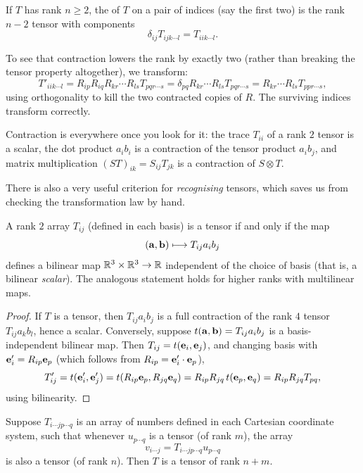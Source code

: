 \documentclass[a4paper]{scrartcl}
\begin{document}
\begin{definition}[Contraction]
	If $T$ has rank $n \geq 2$, the  of $T$ on a pair of indices (say the first two) is the rank $n - 2$ tensor with components
	$$
	\delta_{ij} T_{ijk \cdots l} = T_{iik\cdots l}.
	$$
\end{definition}

To see that contraction lowers the rank by exactly two (rather than breaking the tensor property altogether), we transform:
$$
T'_{iik\cdots l} = R_{ip}R_{iq}R_{kr} \cdots R_{ls} T_{pqr\cdots s} = \delta_{pq} R_{kr}\cdots R_{ls} T_{pqr \cdots s} = R_{kr}\cdots R_{ls}T_{ppr\cdots s},
$$
using orthogonality to kill the two contracted copies of $R$. The surviving indices transform correctly.

Contraction is everywhere once you look for it: the trace $T_{ii}$ of a rank $2$ tensor is a scalar, the dot product $a_i b_i$ is a contraction of the tensor product $a_i b_j$, and matrix multiplication $(ST)_{ik} = S_{ij}T_{jk}$ is a contraction of $S \otimes T$.

There is also a very useful criterion for \emph{recognising} tensors, which saves us from checking the transformation law by hand.

\begin{proposition}
	A rank $2$ array $T_{ij}$ (defined in each basis) is a tensor if and only if the map
	$$
	(\mathbf{a}, \mathbf{b}) \longmapsto T_{ij} a_i b_j
	$$
	defines a bilinear map $\mathbb{R}^3 \times \mathbb{R}^3 \rightarrow \mathbb{R}$ independent of the choice of basis (that is, a bilinear \emph{scalar}). The analogous statement holds for higher ranks with multilinear maps.
\end{proposition}
\begin{proof}
	If $T$ is a tensor, then $T_{ij}a_ib_j$ is a full contraction of the rank $4$ tensor $T_{ij}a_kb_l$, hence a scalar. Conversely, suppose $t(\mathbf{a}, \mathbf{b}) = T_{ij}a_ib_j$ is a basis-independent bilinear map. Then $T_{ij} = t(\mathbf{e}_i, \mathbf{e}_j)$, and changing basis with $\mathbf{e}_i' = R_{ip}\mathbf{e}_p$ (which follows from $R_{ip} = \mathbf{e}_i' \cdot \mathbf{e}_p$),
	$$
	T'_{ij} = t(\mathbf{e}_i', \mathbf{e}_j') = t(R_{ip} \mathbf{e}_p, R_{jq}\mathbf{e}_q) = R_{ip}R_{jq} \, t(\mathbf{e}_p, \mathbf{e}_q) = R_{ip}R_{jq}T_{pq},
	$$
	using bilinearity.
\end{proof}

\begin{theorem}
	Suppose $T_{i \cdots j p \cdots q}$ is an array of numbers defined in each Cartesian coordinate system, such that whenever $u_{p \cdots q}$ is a tensor (of rank $m$), the array
	$$
	v_{i \cdots j} = T_{i\cdots j p \cdots q} u_{p \cdots q}
	$$
	is also a tensor (of rank $n$). Then $T$ is a tensor of rank $n + m$.
\end{theorem}
\end{document}

